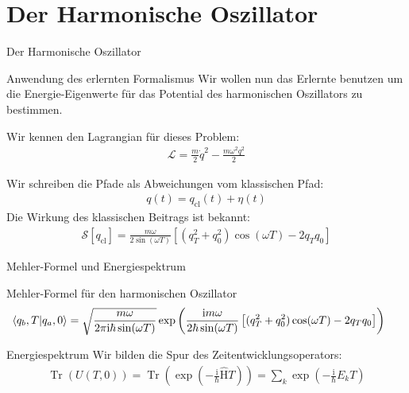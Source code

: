 \section{Der Harmonische Oszillator}
\begin{frame}{Der Harmonische Oszillator}
\begin{block}{\hfill Anwendung des erlernten Formalismus \hfill}
Wir wollen nun das Erlernte benutzen um die Energie-Eigenwerte für das  Potential des harmonischen Oszillators zu bestimmen.
\end{block}
Wir kennen den Lagrangian für dieses Problem: 
\begin{align*}
	\mathcal{L} = \frac{m}{2}\dot{q}^2 - \frac{m\omega^2q^2}{2} 
\end{align*}

Wir schreiben die Pfade als Abweichungen vom klassischen Pfad:
\begin{align*}
	q(t) = q_{\text{cl}}(t) + \eta(t)
\end{align*}
Die Wirkung des klassischen Beitrags ist bekannt:
\begin{align*}
	\mathcal{S}[q_{\text{cl}}] = \frac{m\omega}{2\sin(\omega T)}\left[(q_T^2+q_0^2)\cos(\omega T)- 2q_Tq_0\right]
\end{align*}
\end{frame}

\begin{frame}{Mehler-Formel und Energiespektrum}
\begin{block}{\hfill Mehler-Formel für den harmonischen Oszillator\hfill }
	\begin{align*}
	\hspace{-0.5cm}
		\braket{q_b,T}{q_a,0} = \sqrt{\frac{m\omega}{2\pi\mathrm{i}\hbar \sin(\omega T)}} \exp\left(\frac{\mathrm{i}m\omega}{2\hbar\sin(\omega T)}\left[(q_T^2+q_0^2)\cos(\omega T)- 2q_Tq_0\right] \right)
	\end{align*}
\end{block}

\vfill
\begin{block}{\hfill Energiespektrum \hfill}
Wir bilden die Spur des Zeitentwicklungsoperators:
\begin{align*}
	\operatorname{Tr}(U(T,0)) = \operatorname{Tr}\left(\exp\left(-\frac{\mathrm{i}}{\hbar}\hat{\text{H}}T\right)\right) 
	= \sum_k \exp\left(-\frac{\mathrm{i}}{\hbar}E_k T \right)
\end{align*}
\end{block}	
\end{frame}

